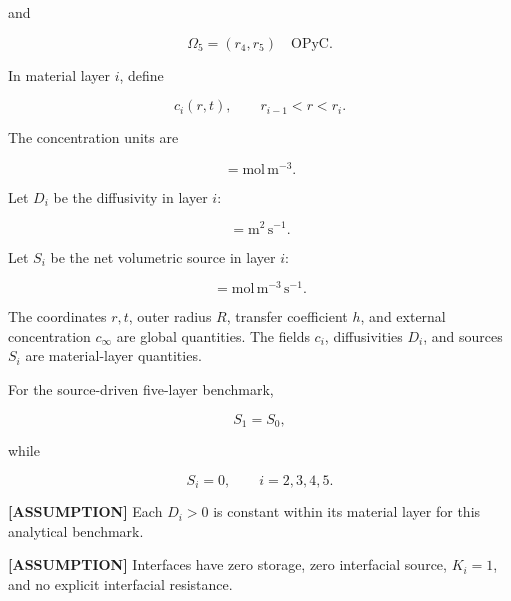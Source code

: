 \documentclass[11pt,a4paper]{article}
\begin{document}
and

\begin{equation}
\Omega_5=(r_4,r_5)
\quad\text{OPyC}.
\tag{TRISO-ML-305}
\label{eq:triso-ml-305}
\end{equation}

In material layer $i$, define

\begin{equation}
c_i(r,t),
\qquad
r_{i-1}<r<r_i.
\tag{TRISO-ML-306}
\label{eq:triso-ml-306}
\end{equation}

The concentration units are

\begin{equation}
[c_i]=\mathrm{mol\,m^{-3}}.
\tag{TRISO-ML-307}
\label{eq:triso-ml-307}
\end{equation}

Let $D_i$ be the diffusivity in layer $i$:

\begin{equation}
[D_i]=\mathrm{m^2\,s^{-1}}.
\tag{TRISO-ML-308}
\label{eq:triso-ml-308}
\end{equation}

Let $S_i$ be the net volumetric source in layer $i$:

\begin{equation}
[S_i]=\mathrm{mol\,m^{-3}\,s^{-1}}.
\tag{TRISO-ML-309}
\label{eq:triso-ml-309}
\end{equation}

The coordinates $r,t$, outer radius $R$, transfer coefficient $h$, and external concentration $c_\infty$ are global quantities. The fields $c_i$, diffusivities $D_i$, and sources $S_i$ are material-layer quantities.

For the source-driven five-layer benchmark,

\begin{equation}
S_1=S_0,
\tag{TRISO-ML-310}
\label{eq:triso-ml-310}
\end{equation}

while

\begin{equation}
S_i=0,
\qquad
i=2,3,4,5.
\tag{TRISO-ML-311}
\label{eq:triso-ml-311}
\end{equation}

\textbf{[ASSUMPTION]} Each $D_i>0$ is constant within its material layer for this analytical benchmark.

\textbf{[ASSUMPTION]} Interfaces have zero storage, zero interfacial source, $K_i=1$, and no explicit interfacial resistance.
\end{document}
